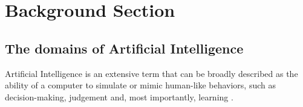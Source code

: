 \documentclass[12pt]{article}
\begin{document}

\newpage
\section{Background Section}



\subsection{The domains of Artificial Intelligence}
Artificial Intelligence is an extensive term that can be broadly described as the ability of a computer to simulate or mimic human-like behaviors, such as decision-making, judgement and, most importantly, learning \autocite{zhangStudyArtificialIntelligence2021}.

\newpage
\printbibliography
\end{document}
